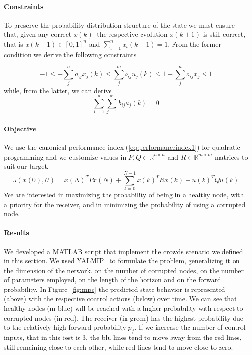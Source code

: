 \documentclass[a4paper, 11pt]{article}
\theoremstyle{definition}
\theoremstyle{remark}
\begin{document}

\paragraph{Constraints} %
\label{par:constraints}
To preserve the probability distribution structure of the state we must ensure that, given any correct $x(k)$, the respective evolution $x(k+1)$ is still correct, that is $x(k+1) \in [0,1]^n$ and $\sum_{i=1}^n x_i(k+1) = 1$. From the former condition we derive the following constraints

\begin{equation} \label{eq:constr1}
	-1 \leq -\sum_j^n a_{ij} x_j(k) \leq \sum_j^m b_{ij} u_j(k) \leq 1 - \sum_j^n a_{ij} x_j \leq 1
\end{equation}
while, from the latter, we can derive
\begin{equation} \label{eq:constr2}
	\sum_{i=1}^n\sum_{j=1}^m b_{ij} u_j(k) = 0
\end{equation}



\paragraph{Objective} %
\label{par:objective1}
We use the canonical performance index (\ref{eq:performanceindex1}) for quadratic programming and we customize values in $P,Q \in \mathbb{R}^{n\times n}$ and $R \in \mathbb{R}^{m\times m}$ matrices to suit our target.
\begin{equation} \label{eq:performanceindex1}
	J(x(0),U) = x(N)^T P x(N) + \sum_{k=0}^{N-1} x(k)^T R x(k) + u(k)^T Q u(k)
\end{equation}
We are interested in maximizing the probability of being in a healthy node, with a priority for the receiver, and in minimizing the probability of using a corrupted node. 

\paragraph{Results} %
\label{par:results}

We developed a MATLAB script that implement the crowds scenario we defined in this section. We used YALMIP~\cite{YALMIP} to formulate the problem, generalizing it on the dimension of the network, on the number of corrupted nodes, on the number of parameters employed, on the length of the horizon and on the forward probability. In Figure~\ref{fig:mpc} the predicted state behavior is represented (above) with the respective control actions (below) over time. We can see that healthy nodes (in blue) will be reached with a higher probability with respect to corrupted nodes (in red). The receiver (in green) has the highest probability due to the relatively high forward probability $p_f$. If we increase the number of control inputs, that in this test is $3$, the blu lines tend to move away from the red lines, still remaining close to each other, while red lines tend to move close to zero.
\end{document}
